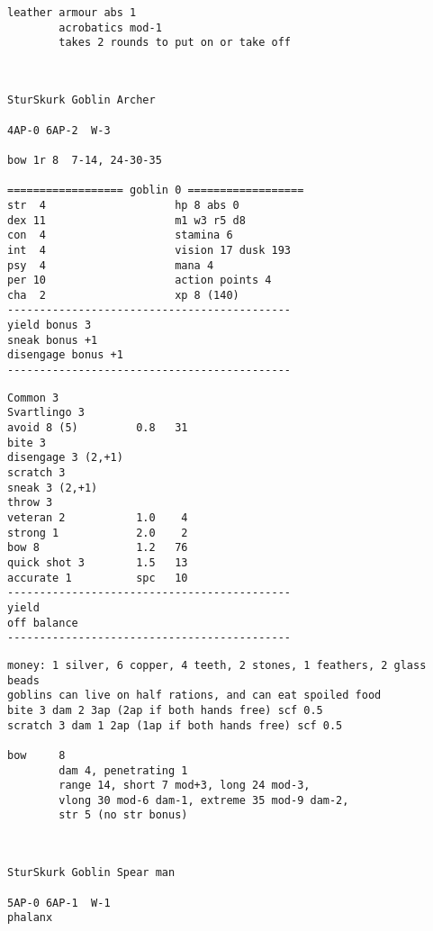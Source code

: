 \begin{verbatim}
leather armour abs 1
        acrobatics mod-1
        takes 2 rounds to put on or take off



\end{verbatim} \pagebreak[2] \begin{verbatim}
SturSkurk Goblin Archer

4AP-0 6AP-2  W-3

bow 1r 8  7-14, 24-30-35

================== goblin 0 ==================
str  4                    hp 8 abs 0
dex 11                    m1 w3 r5 d8
con  4                    stamina 6
int  4                    vision 17 dusk 193
psy  4                    mana 4
per 10                    action points 4
cha  2                    xp 8 (140)
--------------------------------------------
yield bonus 3
sneak bonus +1
disengage bonus +1
--------------------------------------------
\end{verbatim} \goodbreak \begin{verbatim}
Common 3
Svartlingo 3
avoid 8 (5)         0.8   31
bite 3
disengage 3 (2,+1)
scratch 3
sneak 3 (2,+1)
throw 3
veteran 2           1.0    4
strong 1            2.0    2
bow 8               1.2   76
quick shot 3        1.5   13
accurate 1          spc   10
--------------------------------------------
yield
off balance
--------------------------------------------
\end{verbatim} \goodbreak \begin{verbatim}
money: 1 silver, 6 copper, 4 teeth, 2 stones, 1 feathers, 2 glass beads
goblins can live on half rations, and can eat spoiled food
bite 3 dam 2 3ap (2ap if both hands free) scf 0.5
scratch 3 dam 1 2ap (1ap if both hands free) scf 0.5

bow     8
        dam 4, penetrating 1
        range 14, short 7 mod+3, long 24 mod-3,
        vlong 30 mod-6 dam-1, extreme 35 mod-9 dam-2,
        str 5 (no str bonus)



\end{verbatim} \pagebreak[2] \begin{verbatim}
SturSkurk Goblin Spear man

5AP-0 6AP-1  W-1
phalanx


\end{verbatim}
